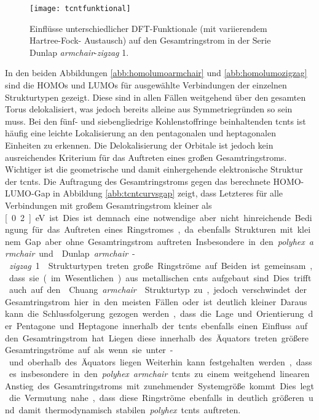 \begin{figure}[ht!]
	\centering
	\texttt{[image: tcntfunktional]}
	\captionsetup{figurewithin = chapter}
	\captionsetup{font=small, labelfont=bf}\caption[Funktionaleinflüsse auf Ringströme]{Einflüsse unterschiedlicher DFT-Funktionale (mit variierendem Hartree-Fock-
Austausch) auf den Gesamtringstrom in der Serie \glqq Dunlap \textit{armchair}-\textit{zigzag} 1\grqq{}.}
\label{abb:tcntfunktional}
\end{figure}

In den beiden Abbildungen \ref{abb:homolumoarmchair} und \ref{abb:homolumozigzag} sind die HOMOs und LUMOs für ausgewählte Verbindungen der einzelnen Strukturtypen gezeigt. Diese sind in allen Fällen weitgehend über den gesamten Torus delokalisiert, was jedoch bereits alleine aus Symmetriegründen so sein muss. Bei den fünf- und siebengliedrige Kohlenstoffringe beinhaltenden \acp{tcnt} ist häufig eine leichte Lokalisierung an den pentagonalen und heptagonalen Einheiten zu erkennen. Die Delokalisierung der Orbitale ist jedoch kein ausreichendes Kriterium für das Auftreten eines großen Gesamtringstroms. Wichtiger ist die geometrische und damit einhergehende elektronische Struktur der \acp{tcnt}. Die Auftragung des Gesamtringstroms gegen das berechnete HOMO-LUMO-Gap in Abbildung \ref{abb:tcntcurvsgap} zeigt, dass Letzteres für alle Verbindungen mit großem Gesamtringstrom kleiner als \unit[0.2]{eV} ist. Dies ist demnach eine notwendige aber nicht hinreichende Bedingung für das Auftreten eines Ringstromes, da ebenfalls Strukturen mit kleinem Gap aber ohne Gesamtringstrom auftreten. Insbesondere in den \textit{polyhex} \textit{armchair} und \glqq Dunlap \textit{armchair}-\textit{zigzag} 1\grqq{} Strukturtypen treten große Ringströme auf. Beiden ist gemeinsam, dass sie (im Wesentlichen) aus metallischen \acp{cnt} aufgebaut sind. Dies trifft auch auf den \glqq Chuang \textit{armchair}\grqq{} Strukturtyp zu, jedoch verschwindet der Gesamtringstrom hier in den meisten Fällen oder ist deutlich kleiner. Daraus kann die Schlussfolgerung gezogen werden, dass die Lage und Orientierung der Pentagone und Heptagone innerhalb der \acp{tcnt} ebenfalls einen Einfluss auf den Gesamtringstrom hat. Liegen diese innerhalb des Äquators treten größere Gesamtringströme auf als wenn sie unter- und oberhalb des Äquators liegen. Weiterhin kann festgehalten werden, dass es insbesondere in den \textit{polyhex} \textit{armchair} \acp{tcnt} zu einem weitgehend linearen Anstieg des Gesamtringstroms mit zunehmender Systemgröße kommt. Dies legt die Vermutung nahe, dass diese Ringströme ebenfalls in deutlich größeren und damit thermodynamisch stabilen \textit{polyhex} \acp{tcnt} auftreten.

